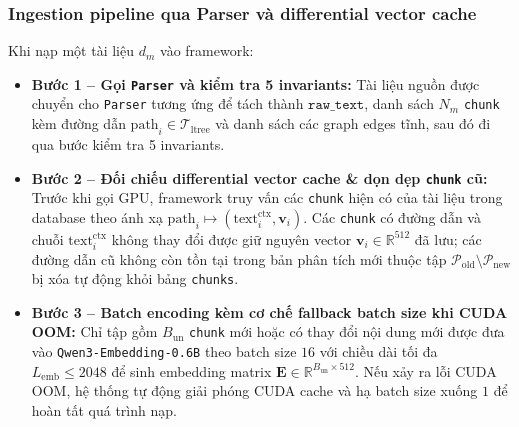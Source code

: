 \subsubsection{Ingestion pipeline qua Parser và differential vector cache}
Khi nạp một tài liệu $d_m$ vào framework:
\begin{itemize}
    \item \textbf{Bước 1 -- Gọi \texttt{Parser} và kiểm tra 5 invariants:} Tài liệu nguồn được chuyển cho \texttt{Parser} tương ứng để tách thành $\texttt{raw\_text}$, danh sách $N_m$ \texttt{chunk} kèm đường dẫn $\text{path}_i \in \mathcal{T}_{\text{ltree}}$ và danh sách các graph edges tĩnh, sau đó đi qua bước kiểm tra 5 invariants.
    \item \textbf{Bước 2 -- Đối chiếu differential vector cache \& dọn dẹp \texttt{chunk} cũ:} Trước khi gọi GPU, framework truy vấn các \texttt{chunk} hiện có của tài liệu trong database theo ánh xạ $\text{path}_i \mapsto (\text{text}^{\text{ctx}}_i, \mathbf{v}_i)$. Các \texttt{chunk} có đường dẫn và chuỗi $\text{text}^{\text{ctx}}_i$ không thay đổi được giữ nguyên vector $\mathbf{v}_i \in \mathbb{R}^{512}$ đã lưu; các đường dẫn cũ không còn tồn tại trong bản phân tích mới thuộc tập $\mathcal{P}_{\text{old}} \setminus \mathcal{P}_{\text{new}}$ bị xóa tự động khỏi bảng \texttt{chunks}.
    \item \textbf{Bước 3 -- Batch encoding kèm cơ chế fallback batch size khi CUDA OOM:} Chỉ tập gồm $B_{\text{un}}$ \texttt{chunk} mới hoặc có thay đổi nội dung mới được đưa vào \texttt{Qwen3-Embedding-0.6B} theo batch size $16$ với chiều dài tối đa $L_{\text{emb}} \le 2048$ để sinh embedding matrix $\mathbf{E} \in \mathbb{R}^{B_{\text{un}} \times 512}$. Nếu xảy ra lỗi CUDA OOM, hệ thống tự động giải phóng CUDA cache và hạ batch size xuống $1$ để hoàn tất quá trình nạp.
\end{itemize}

